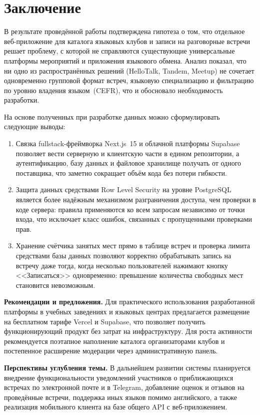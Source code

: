 \section*{Заключение}

В результате проведённой работы подтверждена гипотеза о том, что
отдельное веб-приложение для каталога языковых клубов и записи на
разговорные встречи решает проблему, с которой не справляются
существующие универсальные платформы мероприятий и приложения языкового
обмена. Анализ показал, что ни одно из распространённых решений
(HelloTalk, Tandem, Meetup) не сочетает одновременно групповой формат
встреч, языковую специализацию и фильтрацию по уровню владения языком~(CEFR),
что и обосновало необходимость разработки.

На основе полученных при разработке данных можно сформулировать следующие
выводы:
\begin{enumerate}
    \item Связка fullstack-фреймворка Next.js~15 и облачной платформы
          Supabase позволяет вести серверную и клиентскую части в едином
          репозитории, а аутентификацию, базу данных и файловое хранилище
          получать от одного поставщика, что заметно сокращает объём
           кода без потери гибкости.
    \item Защита данных средствами Row Level Security на уровне PostgreSQL
          является более надёжным механизмом разграничения доступа, чем
          проверки в коде сервера: правила применяются ко всем запросам
          независимо от точки входа, что исключает класс ошибок, связанных
          с пропущенными проверками прав.
    \item Хранение счётчика занятых мест прямо в таблице встреч и
          проверка лимита средствами базы данных позволяют корректно
          обрабатывать запись на встречу даже тогда, когда несколько
          пользователей нажимают кнопку <<Записаться>> одновременно:
          превышение количества свободных мест становится невозможным.
\end{enumerate}

\textbf{Рекомендации и предложения.} Для практического использования
разработанной платформы в учебных заведениях и языковых центрах предлагается
размещение на бесплатном тарифе Vercel и Supabase, что позволяет получить
функционирующий продукт без затрат на инфраструктуру. Для роста активности
рекомендуется поэтапное наполнение каталога организаторами клубов и
постепенное расширение модерации через административную панель.

\textbf{Перспективы углубления темы.} В дальнейшем развитии системы
планируется внедрение функциональности уведомлений участников о
приближающихся встречах по электронной почте и в Telegram, добавление
оценок и отзывов на проведённые встречи, поддержка иных языков помимо
английского, а также реализация мобильного клиента на базе общего API
с веб-приложением.

